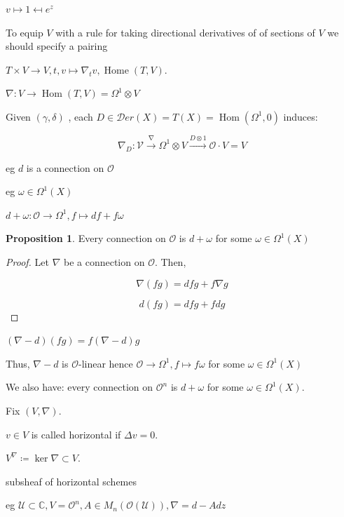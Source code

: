 \documentclass{article}
\theoremstyle{definition}
\newtheorem{proposition}[theorem]{Proposition}
\begin{document}
    \(v \mapsto 1 \mapsfrom e^z\) 

    To equip \(V\) with a rule for taking directional derivatives of of sections of \(V\) we should specify a pairing
    
    \(T \times V \to V, t,v \mapsto \nabla_t v, \operatorname{Home}(T,V)\).
    
    \(\nabla: V \to \operatorname{Hom}(T,V) = \Omega^1 \otimes V\)
    
    Given \((\gamma , \delta)\) , each \(D \in \mathscr{D}er(X) = T(X) = \operatorname{Hom}(\Omega^1, 0)\) induces:

    \[
        \nabla_D : \mathcal{V} \xrightarrow{\nabla} \Omega^1 \otimes V \xrightarrow{D \otimes 1} \mathcal{O} \cdot V = V
    \]

    eg \(d\) is a connection on \(\mathcal{O}\)
    
    eg \(\omega \in \Omega^1(X)\)
    
    \(d+\omega : \mathcal{O} \to \Omega^1, f \mapsto df + f \omega\)
    
    \begin{proposition}
        Every connection on \(\mathcal{O}\) is \(d+\omega\) for some \(\omega \in \Omega ^1(X)\) 
    \end{proposition}

    \begin{proof}
        Let \(\nabla\) be a connection on \(\mathcal{O}\). Then,

        \[
            \nabla(fg) = df g + f \nabla g
        \]

        \[
            d(fg) = df g + f dg
        \]
    \end{proof}

    \((\nabla - d)(fg) = f(\nabla - d) g\) 

    Thus, \(\nabla - d\) is \(\mathcal{O}\)-linear hence \(\mathcal{O} \to \Omega^1, f \mapsto f \omega\) for some \(\omega \in \Omega ^1(X)\) 

    We also have: every connection on \(\mathcal{O}^n\) is \(d+ \omega\) for some \(\omega \in \Omega^1(X)\).

    Fix \((V,\nabla)\).

    \(v\in V\) is called horizontal if \(\Delta v = 0\).

    \(V^\nabla \coloneqq \ker\nabla \subset V\).

    subsheaf of horizontal schemes

    eg \(\mathcal{U} \subset \mathbb{C}, V = \mathcal{O}^n, A \in M_n(\mathcal{O}(\mathcal{U})), \nabla = d - A dz\)
    
\end{document}
